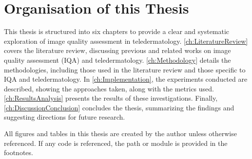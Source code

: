 \section{Organisation of this Thesis}
\label{sec:Structure}
This thesis is structured into six chapters to provide a clear and systematic exploration of image quality assessment in teledermatology. \autoref{ch:LiteratureReview} covers the literature review, discussing previous and related works on image quality assessment (IQA) and teledermatology. \autoref{ch:Methodology} details the methodologies, including those used in the literature review and those specific to IQA and teledermatology. In \autoref{ch:Implementation}, the experiments conducted are described, showing the approaches taken, along with the metrics used. \autoref{ch:ResultsAnalysis} presents the results of these investigations. Finally, \autoref{ch:DiscussionConclusion} concludes the thesis, summarizing the findings and suggesting directions for future research. \par
\vspace{\baselineskip}
\noindent
All figures and tables in this thesis are created by the author unless otherwise referenced. If any code is referenced, the path or module is provided in the footnotes. \par